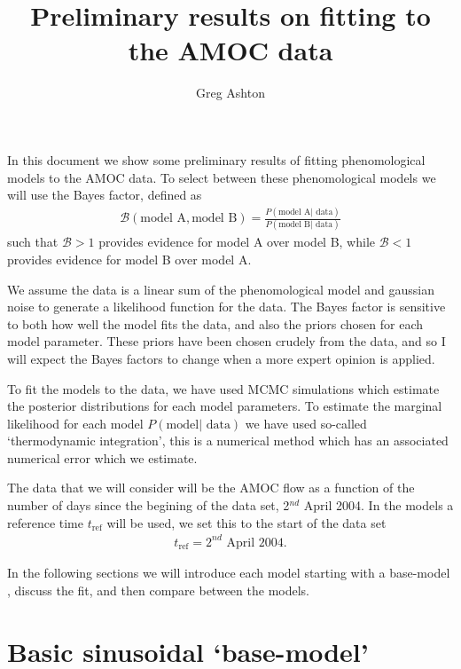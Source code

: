 \documentclass{article}
\newcommand{\tref}{t_{\textrm{ref}}}
\begin{document}

\title{Preliminary results on fitting to the AMOC data}
\author{Greg Ashton}
\date{}
\maketitle

In this document we show some preliminary results of fitting phenomological models
to the AMOC data. To select between these phenomological models we will use the
Bayes factor, defined as
\begin{align}
\mathcal{B}(\textrm{model A}, \textrm{model B}) = \frac{P(\textrm{model A}| \textrm{ data})}{P(\textrm{model B}| \textrm{ data})}
\end{align}
such that $\mathcal{B} > 1$ provides evidence for model A over model B, while
$\mathcal{B} < 1$ provides evidence for model B over model A. 

We assume the data is a linear sum of the phenomological model and
gaussian noise to generate a likelihood function for the data. The Bayes factor
is sensitive to both how well the model fits the data, and also the priors chosen
for each model parameter. These priors have been chosen crudely from the data,
and so I will expect the Bayes factors to change when a more expert opinion is
applied.

To fit the models to the data, we have used MCMC simulations which estimate the
posterior distributions for each model parameters. To estimate the marginal
likelihood for each model $P(\textrm{model}| \textrm{ data})$ we have used
so-called `thermodynamic integration', this is a numerical method which has an
associated numerical error which we estimate.

The data that we will consider will be the AMOC flow as a function of the number
of days since the begining of the data set, 2$^{nd}$ April 2004. In the models a
reference time $\tref$ will be used, we set this to the start of the data set
\begin{align}
\tref = \textrm{2}^{nd}\textrm{ April 2004}.
\end{align}

In the following sections we will introduce each model starting with a
base-model , discuss the fit, and then compare between the models.

\section{Basic sinusoidal `base-model'}
\end{document}
